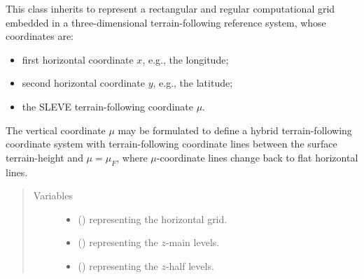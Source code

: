 \documentclass[letterpaper,10pt,english]{sphinxmanual}
\begin{document}
\begin{fulllineitems}
\label{\detokenize{api:tasmania.grids.sleve.SLEVE3d}}
This class inherits {\hyperref[\detokenize{api:tasmania.grids.grid_xyz.GridXYZ}]{}} to represent a rectangular and regular computational grid
embedded in a three-dimensional terrain-following reference system, whose coordinates are:
\begin{itemize}
\item {} 
first horizontal coordinate \(x\), e.g., the longitude;

\item {} 
second horizontal coordinate \(y\), e.g., the latitude;

\item {} 
the SLEVE terrain-following coordinate \(\mu\).

\end{itemize}

The vertical coordinate \(\mu\) may be formulated to define a hybrid terrain-following coordinate system
with terrain-following coordinate lines between the surface terrain-height and \(\mu = \mu_F\), where
\(\mu\)-coordinate lines change back to flat horizontal lines.
\begin{quote}\begin{description}
\item[{Variables}] \leavevmode\begin{itemize}
\item {} 
 () \textendash{} {\hyperref[\detokenize{api:tasmania.grids.grid_xy.GridXY}]{}} representing the horizontal grid.

\item {} 
 () \textendash{} {\hyperref[\detokenize{api:tasmania.grids.axis.Axis}]{}} representing the \(z\)-main levels.

\item {} 
 () \textendash{} {\hyperref[\detokenize{api:tasmania.grids.axis.Axis}]{}} representing the \(z\)-half levels.


\end{itemize}
\end{description}
\end{quote}
\end{fulllineitems}
\end{document}
